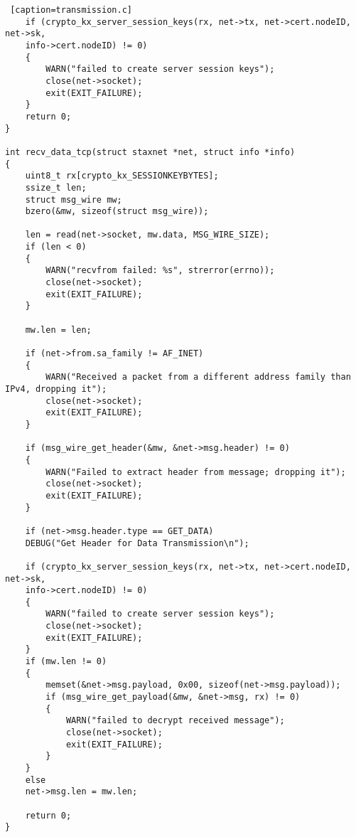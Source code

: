 \begin{lstlisting} [caption=transmission.c]
	if (crypto_kx_server_session_keys(rx, net->tx, net->cert.nodeID, net->sk,
	info->cert.nodeID) != 0)
	{
		WARN("failed to create server session keys");
		close(net->socket);
		exit(EXIT_FAILURE);
	}
	return 0;
}

int recv_data_tcp(struct staxnet *net, struct info *info)
{
	uint8_t	rx[crypto_kx_SESSIONKEYBYTES];
	ssize_t len;
	struct msg_wire mw;
	bzero(&mw, sizeof(struct msg_wire));
	
	len = read(net->socket, mw.data, MSG_WIRE_SIZE);
	if (len < 0)
	{
		WARN("recvfrom failed: %s", strerror(errno));
		close(net->socket);
		exit(EXIT_FAILURE);
	}
	
	mw.len = len;
	
	if (net->from.sa_family != AF_INET)
	{
		WARN("Received a packet from a different address family than IPv4, dropping it");
		close(net->socket);
		exit(EXIT_FAILURE);
	}
	
	if (msg_wire_get_header(&mw, &net->msg.header) != 0)
	{
		WARN("Failed to extract header from message; dropping it");
		close(net->socket);
		exit(EXIT_FAILURE);
	}
	
	if (net->msg.header.type == GET_DATA)
	DEBUG("Get Header for Data Transmission\n");
	
	if (crypto_kx_server_session_keys(rx, net->tx, net->cert.nodeID, net->sk,
	info->cert.nodeID) != 0)
	{
		WARN("failed to create server session keys");
		close(net->socket);
		exit(EXIT_FAILURE);
	}
	if (mw.len != 0)
	{
		memset(&net->msg.payload, 0x00, sizeof(net->msg.payload));
		if (msg_wire_get_payload(&mw, &net->msg, rx) != 0)
		{
			WARN("failed to decrypt received message");
			close(net->socket);
			exit(EXIT_FAILURE);
		}
	}
	else
	net->msg.len = mw.len;
	
	return 0;
}

\end{lstlisting}


